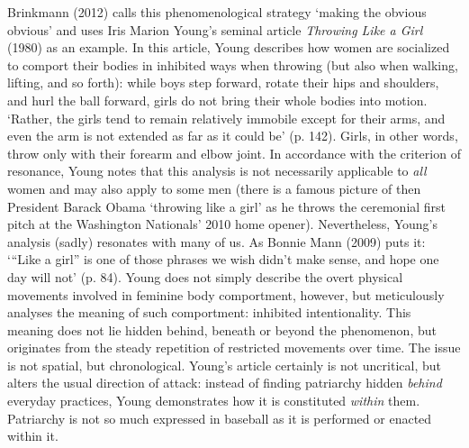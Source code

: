 \begin{adjmulticols}{2}{0mm}{0mm}
Brinkmann (2012) calls this phenomenological strategy ‘making the obvious obvious’ and uses Iris Marion Young’s seminal article \textit{Throwing Like a Girl} (1980) as an example. In this article, Young describes how women are socialized to comport their bodies in inhibited ways when throwing (but also when walking, lifting, and so forth): while boys step forward, rotate their hips and shoulders, and hurl the ball forward, girls do not bring their whole bodies into motion. ‘Rather, the girls tend to remain relatively immobile except for their arms, and even the arm is not extended as far as it could be’ (p. 142). Girls, in other words, throw only with their forearm and elbow joint. In accordance with the criterion of resonance, Young notes that this analysis is not necessarily applicable to \textit{all }women and may also apply to some men (there is a famous picture of then President Barack Obama ‘throwing like a girl’ as he throws the ceremonial first pitch at the Washington Nationals’ 2010 home opener). Nevertheless, Young’s analysis (sadly) resonates with many of us. As Bonnie Mann (2009) puts it: ‘“Like a girl” is one of those phrases we wish didn’t make sense, and hope one day will not’ (p. 84). Young does not simply describe the overt physical movements involved in feminine body comportment, however, but meticulously analyses the meaning of such comportment: inhibited intentionality. This meaning does not lie hidden behind, beneath or beyond the phenomenon, but originates from the steady repetition of restricted movements over time. The issue is not spatial, but chronological. Young’s article certainly is not uncritical, but alters the usual direction of attack: instead of finding patriarchy hidden \textit{behind} everyday practices, Young demonstrates how it is constituted \textit{within} them. Patriarchy is not so much expressed in baseball as it is performed or enacted within it.


\end{adjmulticols}

